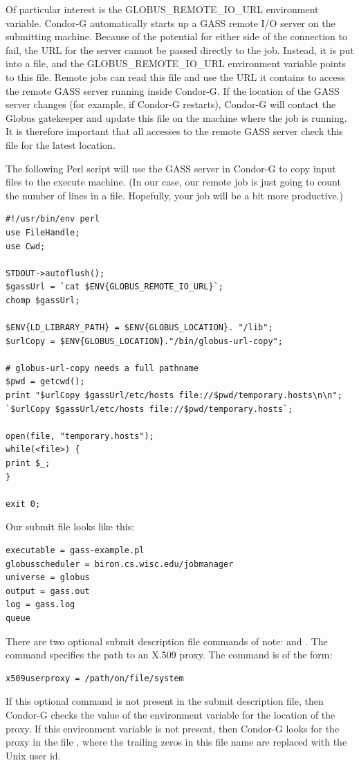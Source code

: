 Of particular interest is the GLOBUS\_REMOTE\_IO\_URL environment variable.
Condor-G automatically starts up a GASS remote I/O
server on the submitting machine.
Because of the potential for either side of the connection to fail,
the URL for the server cannot be passed directly to the job.
Instead, it is put into a file, and the GLOBUS\_REMOTE\_IO\_URL
environment variable points to this file. 
Remote jobs can read this file and use the URL it contains
to access the remote GASS server running inside Condor-G.
If the location
of the GASS server changes (for example, if Condor-G restarts),
Condor-G will contact the Globus gatekeeper and update this file on
the machine where the job is running.
It is therefore important that all accesses to
the remote GASS server check this file for the latest location.

The following Perl script will use the GASS server in Condor-G
to copy input files to the execute machine.
(In our case, our remote job
is just going to count the number of lines in a file.
Hopefully, your job will be a bit more productive.)

\begin{verbatim}
#!/usr/bin/env perl
use FileHandle;
use Cwd;

STDOUT->autoflush();
$gassUrl = `cat $ENV{GLOBUS_REMOTE_IO_URL}`;
chomp $gassUrl;

$ENV{LD_LIBRARY_PATH} = $ENV{GLOBUS_LOCATION}. "/lib";
$urlCopy = $ENV{GLOBUS_LOCATION}."/bin/globus-url-copy";

# globus-url-copy needs a full pathname
$pwd = getcwd();
print "$urlCopy $gassUrl/etc/hosts file://$pwd/temporary.hosts\n\n";
`$urlCopy $gassUrl/etc/hosts file://$pwd/temporary.hosts`;

open(file, "temporary.hosts");
while(<file>) {
print $_;
}

exit 0;
\end{verbatim}

Our submit file looks like this:

\begin{verbatim}
executable = gass-example.pl
globusscheduler = biron.cs.wisc.edu/jobmanager
universe = globus
output = gass.out
log = gass.log
queue
\end{verbatim}

There are two optional submit description file commands
of note:
 and
.
The  command specifies the path to
an X.509 proxy.
The command is of the form:
\begin{verbatim}
x509userproxy = /path/on/file/system
\end{verbatim}
If this optional command is not present in the submit description file,
then Condor-G checks the value of the environment variable
 for the location of the proxy.
If this environment variable is not present, then Condor-G
looks for the proxy in the file
,
where the trailing zeros in this file name are
replaced with the Unix user id.

